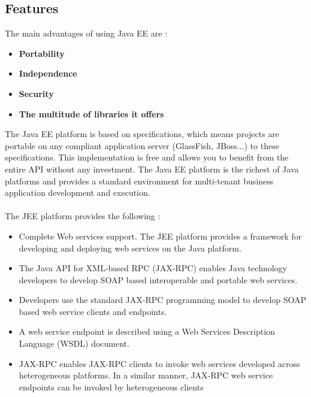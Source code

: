 \subsection{Features}
The main advantages of using Java EE are :
\begin{itemize}
	\item \textbf{Portability}
	\item \textbf{Independence}
	\item \textbf{Security}
	\item \textbf{The multitude of libraries it offers}
\end{itemize}
The Java EE platform is based on specifications, which means projects are portable on any compliant application server (GlassFish, JBoss...) to these specifications. This implementation is free and allows you to benefit from the entire API without any investment. The Java EE platform is the richest of Java platforms and provides a standard environment for multi-tenant business application development and execution. 
\\
\\
The JEE platform provides the following :
\begin{itemize}
	\item Complete Web services support. The JEE platform provides a framework for developing and deploying web services on the Java platform. 
	\item The Java API for XML-based RPC (JAX-RPC) enables Java technology developers to develop SOAP based interoperable and portable web services.
	\item Developers use the standard JAX-RPC programming model to develop SOAP based web service clients and endpoints.
	\item A web service endpoint is described using a Web Services Description Language (WSDL) document.
	\item JAX-RPC enables JAX-RPC clients to invoke web services developed across heterogeneous platforms. In a similar manner, JAX-RPC web service endpoints can be invoked by heterogeneous clients
\end{itemize}


